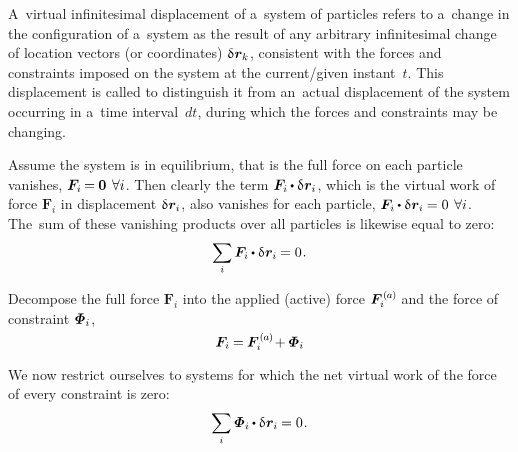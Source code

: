 A~virtual infinitesimal displacement of a~system of particles refers to a~change in the configuration of a~system as the result of any arbitrary infinitesimal change of location vectors (or coordinates) ${\variation{\hspace{.1ex}\locationvector_k}}$, consistent with the forces and constraints imposed on the system at the current/given instant~$t$.
This displacement is called  to distinguish it from an~actual displacement of the system occurring in a~time interval~${dt}$, during which the forces and constraints may be changing.

Assume the system is in equilibrium, that is the full force on each particle vanishes, ${\bm{F}_i \hspace{-0.2ex} = \hspace{-0.1ex} \bm{0} \hspace{.4em} \forall i}$.
Then clearly the term ${\bm{F}_i \hspace{-0.1ex} \dotp \variation{\hspace{.1ex}\locationvector_i}}$, which is the virtual work of force ${\bm{F}_i}$ in displacement ${\variation{\hspace{.1ex}\locationvector_i}}$, also vanishes for each particle, ${\bm{F}_i \hspace{-0.1ex} \dotp \variation{\hspace{.1ex}\locationvector_i} \hspace{-0.1ex} = 0 \hspace{.4em} \forall i}$.
The~sum of these vanishing products over all particles is likewise equal to zero:
\[
\displaystyle\sum_{\smash{i}} \bm{F}_i \hspace{-0.1ex} \dotp \variation{\hspace{.1ex}\locationvector_i} \hspace{-0.1ex} = 0
\hspace{.15ex} .
\]

Decompose the full force ${\bm{F}_i}$ into the applied (active) force ${\bm{F}_{i}^{\smthactive}}$ and the force of constraint ${\mathboldPhi_{i}}$,
\[
\bm{F}_i \hspace{-0.1ex} = \hspace{-0.1ex} \bm{F}_{i}^{\smthactive} \hspace{-0.2ex} + \hspace{-0.1ex} \mathboldPhi_{i}
\]

We now restrict ourselves to systems for which the net virtual work of the force of every constraint is zero:
\[
\displaystyle\sum_{\smash{i}} \mathboldPhi_i \hspace{-0.1ex} \dotp \variation{\hspace{.1ex}\locationvector_i} \hspace{-0.1ex} = 0
\hspace{.15ex} .
\]

